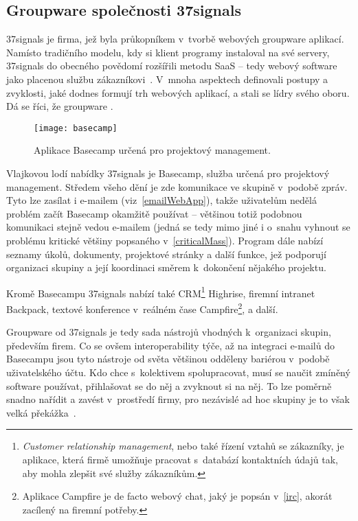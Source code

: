 \documentclass[12pt,oneside,final]{fithesis2}
\begin{document}
\subsection{Groupware společnosti 37signals}\label{37signals}
37signals je firma, jež byla průkopníkem v~tvorbě webových groupware aplikací. Namísto tradičního modelu, kdy si klient programy instaloval na své servery, 37signals do obecného povědomí rozšířili metodu SaaS -- tedy webový software jako placenou službu zákazníkovi~\cite{37signals2008getting}. V~mnoha aspektech definovali postupy a zvyklosti, jaké dodnes formují trh webových aplikací, a stali se lídry svého oboru. Dá se říci, že groupware .

\begin{figure}[H]
    \texttt{[image: basecamp]}
    \caption{Aplikace Basecamp určená pro projektový management.}
\end{figure}

Vlajkovou lodí nabídky 37signals je Basecamp, služba určená pro projektový management. Středem všeho dění je zde komunikace ve skupině v~podobě zpráv. Tyto lze zasílat i e-mailem (viz~\ref{emailWebApp}), takže uživatelům nedělá problém začít Basecamp okamžitě používat -- většinou totiž podobnou komunikaci stejně vedou e-mailem (jedná se tedy mimo jiné i o~snahu vyhnout se problému kritické většiny popsaného v~\ref{criticalMass}). Program dále nabízí seznamy úkolů, dokumenty, projektové stránky a další funkce, jež podporují organizaci skupiny a její koordinaci směrem k~dokončení nějakého projektu.

Kromě Basecampu 37signals nabízí také CRM\footnote{\emph{Customer relationship management}, nebo také řízení vztahů se zákazníky, je aplikace, která firmě umožňuje pracovat s~databází kontaktních údajů tak, aby mohla zlepšit své služby zákazníkům.} Highrise, firemní intranet Backpack, textové konference v~reálném čase Campfire\footnote{Aplikace Campfire je de facto webový chat, jaký je popsán v~\ref{irc}, akorát zacílený na firemní potřeby.}, a další.

Groupware od 37signals je tedy sada nástrojů vhodných k~organizaci skupin, především firem. Co se ovšem interoperability týče, až na integraci e-mailů do Basecampu jsou tyto nástroje od světa většinou odděleny bariérou v~podobě uživatelského účtu. Kdo chce s~kolektivem spolupracovat, musí se naučit zmíněný software používat, přihlašovat se do něj a zvyknout si na něj. To lze poměrně snadno nařídit a zavést v~prostředí firmy, pro nezávislé ad hoc skupiny je to však velká překážka~\cite{grudin1994groupware}.
\end{document}
